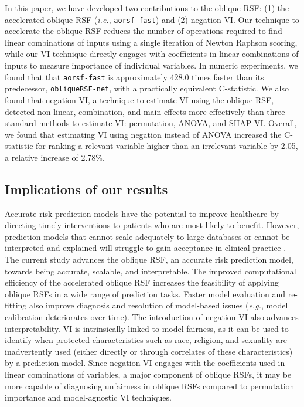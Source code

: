 \documentclass{article}\usepackage[]{graphicx}\usepackage[]{xcolor}
\newcommand{\ie}{\textit{i.e.}}
\newcommand{\eg}{\textit{e.g.}}
\begin{document}
In this paper, we have developed two contributions to the oblique RSF: (1) the accelerated oblique RSF (\ie, \texttt{aorsf-fast}) and (2) negation VI. Our technique to accelerate the oblique RSF reduces the number of operations required to find linear combinations of inputs using a single iteration of Newton Raphson scoring, while our VI technique directly engages with coefficients in linear combinations of inputs to measure importance of individual variables. In numeric experiments, we found that that \texttt{aorsf-fast} is approximately 428.0 times faster than its predecessor, \texttt{obliqueRSF-net}, with a practically equivalent C-statistic. We also found that negation VI, a technique to estimate VI using the oblique RSF, detected non-linear, combination, and main effects more effectively than three standard methods to estimate VI: permutation, ANOVA, and SHAP VI. Overall, we found that estimating VI using negation instead of ANOVA increased the C-statistic for ranking a relevant variable higher than an irrelevant variable by 2.05, a relative increase of 2.78\%.

\subsection{Implications of our results}

Accurate risk prediction models have the potential to improve healthcare by directing timely interventions to patients who are most likely to benefit. However, prediction models that cannot scale adequately to large databases or cannot be interpreted and explained will struggle to gain acceptance in clinical practice \citep{moss2022demystifying}. The current study advances the oblique RSF, an accurate risk prediction model, towards being accurate, scalable, and interpretable. The improved computational efficiency of the accelerated oblique RSF increases the feasibility of applying oblique RSFs in a wide range of prediction tasks. Faster model evaluation and re-fitting also improve diagnosis and resolution of model-based issues (\eg, model calibration deteriorates over time). The introduction of negation VI also advances interpretability. VI is intrinsically linked to model fairness, as it can be used to identify when protected characteristics such as race, religion, and sexuality are inadvertently used (either directly or through correlates of these characteristics) by a prediction model. Since negation VI engages with the coefficients used in linear combinations of variables, a major component of oblique RSFs, it may be more capable of diagnosing unfairness in oblique RSFs compared to permutation importance and model-agnostic VI techniques.
\end{document}
